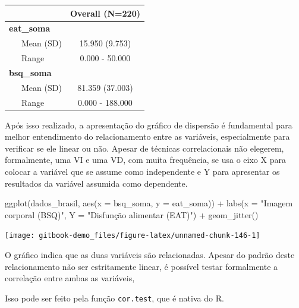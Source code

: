 \documentclass[
]{book}
\newenvironment{Shaded}{\begin{snugshade}}{\end{snugshade}}
\newcommand{\AttributeTok}[1]{\textcolor[rgb]{0.77,0.63,0.00}{#1}}
\newcommand{\FunctionTok}[1]{\textcolor[rgb]{0.00,0.00,0.00}{#1}}
\newcommand{\NormalTok}[1]{#1}
\newcommand{\SpecialCharTok}[1]{\textcolor[rgb]{0.00,0.00,0.00}{#1}}
\newcommand{\StringTok}[1]{\textcolor[rgb]{0.31,0.60,0.02}{#1}}
\begin{document}
\begin{longtable}[]{@{}lc@{}}
\toprule
& Overall (N=220) \\
\midrule
\endhead
\textbf{eat\_soma} & \\
~~~Mean (SD) & 15.950 (9.753) \\
~~~Range & 0.000 - 50.000 \\
\textbf{bsq\_soma} & \\
~~~Mean (SD) & 81.359 (37.003) \\
~~~Range & 0.000 - 188.000 \\
\bottomrule
\end{longtable}

Após isso realizado, a apresentação do gráfico de dispersão é fundamental para melhor entendimento do relacionamento entre as variáveis, especialmente para verificar se ele linear ou não. Apesar de técnicas correlacionais não elegerem, formalmente, uma VI e uma VD, com muita frequência, se usa o eixo X para colocar a variável que se assume como independente e Y para apresentar os resultados da variável assumida como dependente.

\begin{Shaded}
\begin{Highlighting}[]
\FunctionTok{ggplot}\NormalTok{(dados\_brasil, }\FunctionTok{aes}\NormalTok{(}\AttributeTok{x =}\NormalTok{ bsq\_soma, }\AttributeTok{y =}\NormalTok{ eat\_soma)) }\SpecialCharTok{+}
  \FunctionTok{labs}\NormalTok{(}\AttributeTok{x =} \StringTok{"Imagem corporal (BSQ)"}\NormalTok{, }
       \AttributeTok{Y =} \StringTok{"Disfunção alimentar (EAT)"}\NormalTok{) }\SpecialCharTok{+}
  \FunctionTok{geom\_jitter}\NormalTok{()}
\end{Highlighting}
\end{Shaded}

\begin{center}\texttt{[image: gitbook-demo\_files/figure-latex/unnamed-chunk-146-1]} \end{center}

O gráfico indica que as duas variáveis são relacionadas. Apesar do padrão deste relacionamento não ser estritamente linear, é possível testar formalmente a correlação entre ambas as variáveis,

Isso pode ser feito pela função \texttt{cor.test}, que é nativa do R.

\begin{Shaded}
\end{Shaded}
\end{document}
